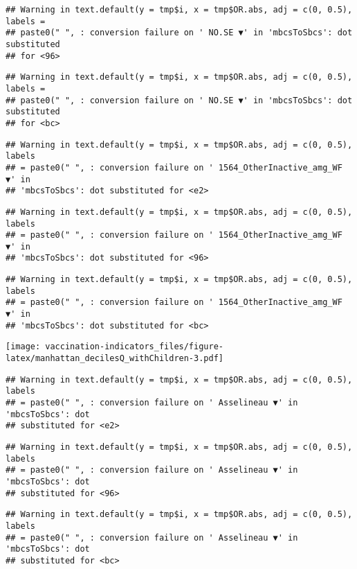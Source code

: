 \documentclass[
]{article}
\begin{document}
\begin{verbatim}
## Warning in text.default(y = tmp$i, x = tmp$OR.abs, adj = c(0, 0.5), labels =
## paste0(" ", : conversion failure on ' NO.SE ▼' in 'mbcsToSbcs': dot substituted
## for <96>
\end{verbatim}

\begin{verbatim}
## Warning in text.default(y = tmp$i, x = tmp$OR.abs, adj = c(0, 0.5), labels =
## paste0(" ", : conversion failure on ' NO.SE ▼' in 'mbcsToSbcs': dot substituted
## for <bc>
\end{verbatim}

\begin{verbatim}
## Warning in text.default(y = tmp$i, x = tmp$OR.abs, adj = c(0, 0.5), labels
## = paste0(" ", : conversion failure on ' 1564_OtherInactive_amg_WF ▼' in
## 'mbcsToSbcs': dot substituted for <e2>
\end{verbatim}

\begin{verbatim}
## Warning in text.default(y = tmp$i, x = tmp$OR.abs, adj = c(0, 0.5), labels
## = paste0(" ", : conversion failure on ' 1564_OtherInactive_amg_WF ▼' in
## 'mbcsToSbcs': dot substituted for <96>
\end{verbatim}

\begin{verbatim}
## Warning in text.default(y = tmp$i, x = tmp$OR.abs, adj = c(0, 0.5), labels
## = paste0(" ", : conversion failure on ' 1564_OtherInactive_amg_WF ▼' in
## 'mbcsToSbcs': dot substituted for <bc>
\end{verbatim}

\texttt{[image: vaccination-indicators\_files/figure-latex/manhattan\_decilesQ\_withChildren-3.pdf]}

\begin{verbatim}
## Warning in text.default(y = tmp$i, x = tmp$OR.abs, adj = c(0, 0.5), labels
## = paste0(" ", : conversion failure on ' Asselineau ▼' in 'mbcsToSbcs': dot
## substituted for <e2>
\end{verbatim}

\begin{verbatim}
## Warning in text.default(y = tmp$i, x = tmp$OR.abs, adj = c(0, 0.5), labels
## = paste0(" ", : conversion failure on ' Asselineau ▼' in 'mbcsToSbcs': dot
## substituted for <96>
\end{verbatim}

\begin{verbatim}
## Warning in text.default(y = tmp$i, x = tmp$OR.abs, adj = c(0, 0.5), labels
## = paste0(" ", : conversion failure on ' Asselineau ▼' in 'mbcsToSbcs': dot
## substituted for <bc>
\end{verbatim}
\end{document}
